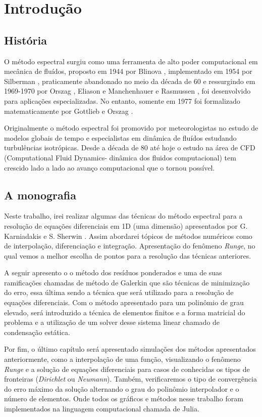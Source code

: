 \chapter{Introdução}
\label{cap:introducao}
\section{História}
O método espectral surgiu como uma ferramenta de alto poder computacional em mecânica de fluídos, proposto em 1944 por Blinova \cite{blinova1944}, implementado em 1954 por Silberman \cite{silberman}, praticamente abandonado no meio da década de 60 e ressurgindo em 1969-1970 por Orszag \cite{Orszag70}, Eliason e Manchenhauer  e Rasmussen \cite{eliasenauermussen}, foi desenvolvido para aplicações especializadas. No entanto,  somente em 1977 foi formalizado matematicamente por Gottlieb e Orszag \cite{Orslieb77}.

Originalmente o método espectral foi promovido por meteorologistas no estudo de modelos globais de tempo e especialistas em dinâmica de fluídos estudando turbulências isotrópicas. Desde a década de 80 até hoje o  estudo na área de CFD (Computational Fluid Dynamics- dinâmica dos fluidos computacional) tem crescido lado a lado ao avanço computacional que o tornou possível.
\section{A monografia}
 Neste trabalho, irei realizar algumas das técnicas do método espectral para a resolução de equações diferenciais em 1D (uma dimensão) apresentados por G. Karniadakis e S. Sherwin \citep{book:karniadakis}. Assim abordarei tópicos de métodos numéricos como de interpolação, diferenciação e integração. Apresentação do fenômeno \emph{Runge}, no qual vemos a melhor escolha de pontos para a resolução das técnicas anteriores.
 
 A seguir apresento o o método dos resíduos ponderados e uma de suas ramificações chamadas de  método de Galerkin que são técnicas de minimização do erro, essa última sendo a técnica que será utilizado para a resolução de equações diferenciais. Com o método apresentado para um polinômio de grau elevado, será introduzido a técnica de elementos finitos e a forma matricial do problema e a utilização de um solver desse sistema linear chamado de condensação estática.
 
 Por fim, o último capítulo será apresentado simulações dos métodos apresentados anteriormente, como a interpolação de uma função, visualizando o fenômeno \emph{Runge} e a solução de equações diferenciais para casos de conhecidas os tipos de fronteiras (\emph{Dirichlet} ou \emph{Neumann}). Também, verificaremos o tipo de convergência do erro máximo da solução alternando o grau do polinômio interpolador e o número de elementos. Onde todos os gráficos e métodos nesse trabalho foram implementados na linguagem computacional chamada de Julia.
  
